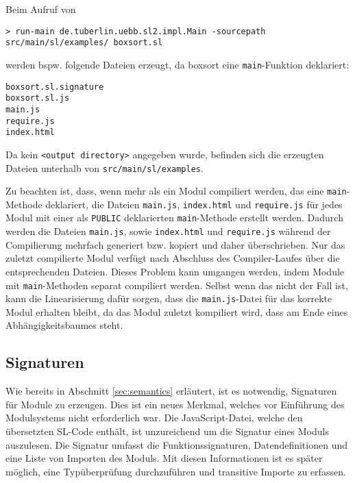 \documentclass[runningheads]{llncs}
\begin{document}
\begin{description}
\begin{description}
        Beim Aufruf von
         
\begin{verbatim}
> run-main de.tuberlin.uebb.sl2.impl.Main -sourcepath
src/main/sl/examples/ boxsort.sl
\end{verbatim}

        werden bspw. folgende Dateien erzeugt, da boxsort eine
        \texttt{main}-Funktion deklariert:
        
\begin{verbatim}
boxsort.sl.signature
boxsort.sl.js
main.js
require.js
index.html
\end{verbatim}

        Da kein \texttt{<output directory>} angegeben wurde, befinden
        sich die erzeugten Dateien unterhalb von \texttt{src/main/sl/examples}.
        
        Zu beachten ist, dass, wenn mehr als ein Modul compiliert
        werden, das eine \texttt{main}-Methode deklariert, die Dateien
        \texttt{main.js}, \texttt{index.html} und \texttt{require.js}
        für jedes Modul mit einer als \texttt{PUBLIC} deklarierten
        \texttt{main}-Methode erstellt werden. Dadurch werden die
        Dateien \texttt{main.js}, sowie \texttt{index.html} und
        \texttt{require.js} während der Compilierung mehrfach generiert
        bzw. kopiert und daher überschrieben. Nur das zuletzt compilierte Modul verfügt
        nach Abschluss des Compiler-Laufes über die entsprechenden
        Dateien. Dieses Problem kann umgangen werden, indem Module mit
        \texttt{main}-Methoden separat compiliert werden. Selbst wenn
        das nicht der Fall ist, kann die Linearisierung dafür sorgen,
        dass die \texttt{main.js}-Datei für das korrekte Modul
        erhalten bleibt, da das Modul zuletzt kompiliert wird, dass
        am Ende eines Abhängigkeitsbaumes steht.
    \end{description}
\end{description}

\subsection{Signaturen}
\label{sec:compSig}

Wie bereits in Abschnitt \ref{sec:semantics} erläutert, ist es notwendig, Signaturen für Module zu erzeugen. Dies ist ein neues Merkmal, welches vor Einführung des Modulsystems nicht erforderlich war. Die JavaScript-Datei, welche den übersetzten SL-Code enthält, ist unzureichend um die Signatur eines Moduls auszulesen. Die Signatur umfasst die Funktionssignaturen, Datendefinitionen und eine Liste von Importen des Moduls. Mit diesen Informationen ist es später möglich, eine Typüberprüfung durchzuführen und transitive Importe zu erfassen.
\end{document}
